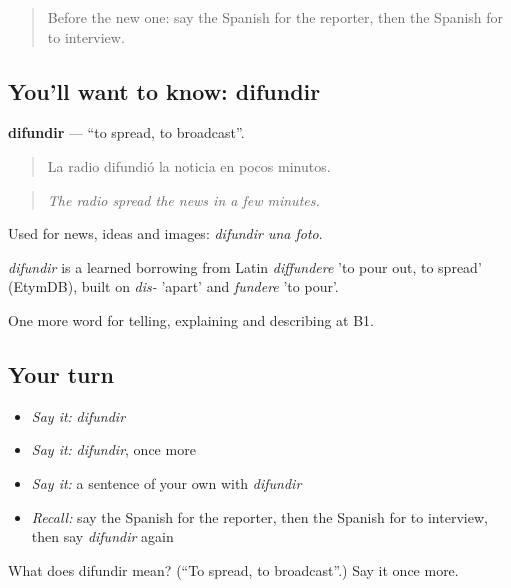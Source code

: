 \begin{quote}
Before the new one: say the Spanish for the reporter, then the Spanish for to interview.
\end{quote}

\subsection*{You'll want to know: difundir}
\textbf{difundir} — \textquotedblleft{}to spread, to broadcast\textquotedblright{}.

\begin{quote}
La radio difundió la noticia en pocos minutos.
\end{quote}

\begin{quote}
\emph{The radio spread the news in a few minutes.}
\end{quote}

Used for news, ideas and images: \emph{difundir una foto}.

\begin{cousinweb}
\emph{difundir} is a learned borrowing from Latin \emph{diffundere} 'to pour out, to spread' (EtymDB), built on \emph{dis-} 'apart' and \emph{fundere} 'to pour'.
\end{cousinweb}

\begin{grammarlens}[title={What you've built}]
One more word for telling, explaining and describing at B1.
\end{grammarlens}

\subsection*{Your turn}
\begin{itemize}
\raggedright
  \item \emph{Say it:} \emph{difundir}
  \item \emph{Say it:} \emph{difundir}, once more
  \item \emph{Say it:} a sentence of your own with \emph{difundir}
  \item \emph{Recall:} say the Spanish for the reporter, then the Spanish for to interview, then say \emph{difundir} again
\end{itemize}

\begin{tcolorbox}[breakable,colback=teal!4,colframe=teal!35!black,title={Before you move on}]
What does difundir mean? (\textquotedblleft{}To spread, to broadcast\textquotedblright{}.) Say it once more.
\end{tcolorbox}
